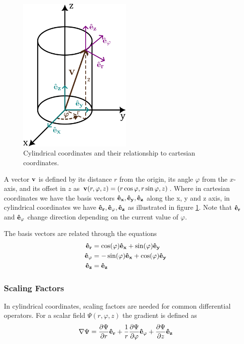 \begin{figure}
    \includegraphics[width=0.5\textwidth]{figs/cylcoords}
    \caption{Cylindrical coordinates and their relationship to cartesian coordinates.}
    \label{fig:cylcoords}
\end{figure}

A vector $\vb{v}$ is defined by its distance $r$ from the origin, its
angle $\varphi$ from the $x$-axis, and its offset in $z$ as
$\vb{v}(r, \varphi, z)  = (r\cos \varphi, r\sin \varphi, z)$.
Where in cartesian coordinates we have
the basis vectors $\vb{\hat{e}_x}, \vb{\hat{e}_y}, \vb{\hat{e}_z}$
along the x, y and z axis, in cylindrical coordinates we have
$\vb{\hat{e}_r}, \vb{\hat{e}_\varphi}, \vb{\hat{e}_z}$ as illustrated in
figure \ref{fig:cylcoords}. Note that $\vb{\hat{e}_r}$ and $\vb{\hat{e}_\varphi}$
change direction depending on the current value of $\varphi$.

The basis vectors are related through the equations
\begin{align}
    \vb{\hat{e}_r} &= \cos(\varphi)\vb{\hat{e}_x} + \sin(\varphi)\vb{\hat{e}_y} \\
    \vb{\hat{e}_\varphi} &= -\sin(\varphi)\vb{\hat{e}_x} + \cos(\varphi)\vb{\hat{e}_y} \\
    \vb{\hat{e}_z} &= \vb{\hat{e}_z}
\end{align}

\subsubsection{Scaling Factors}
In cylindrical coordinates, scaling factors are needed for
common differential operators. For a scalar field $\Psi(r, \varphi, z)$
the gradient is defined as
\begin{equation}
    \nabla \Psi = \frac{\partial \Psi}{\partial r} \vb{\hat{e}_r} +
    \frac{1}{r} \frac{\partial \Psi}{\partial \varphi} \vb{\hat{e}_\varphi} +
    \frac{\partial \Psi}{\partial z} \vb{\hat{e}_z}
    \label{eq:cylgrad}
\end{equation}


